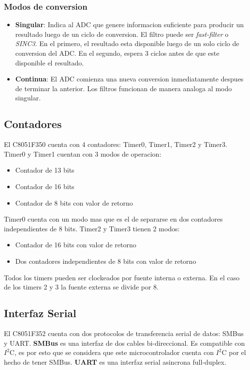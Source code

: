 \documentclass{article}
\theoremstyle{definition}
\theoremstyle{remark}
\begin{document}
\subsubsection{Modos de conversion}
\begin{itemize}
  \item \textbf{Singular}: Indica al ADC que genere informacion suficiente para producir un resultado luego de un ciclo de conversion. El filtro puede ser \emph{fast-filter} o \emph{SINC3}. En el primero, el resultado esta disponible luego de un solo ciclo de conversion del ADC. En el segundo, espera 3 ciclos antes de que este disponible el resultado.
  \item \textbf{Continua}: El ADC comienza una nueva conversion inmediatamente despues de terminar la anterior. Los filtros funcionan de manera analoga al modo singular.
\end{itemize}

\subsection{Contadores}\label{sec:contadores}
El C8051F350 cuenta con 4 contadores: Timer0, Timer1, Timer2 y Timer3. Timer0 y Timer1 cuentan con 3 modos de operacion:
\begin{itemize}
  \item Contador de 13 bits
  \item Contador de 16 bits
  \item Contador de 8 bits con valor de retorno
\end{itemize}
Timer0 cuenta con un modo mas que es el de separarse en dos contadores independientes de 8 bits.
Timer2 y Timer3 tienen 2 modos:
 \begin{itemize}
   \item Contador de 16 bits con valor de retorno
   \item Dos contadores independientes de 8 bits con valor de retorno
 \end{itemize}

Todos los timers pueden ser clockeados por fuente interna o externa. En el caso de los timers 2 y 3 la fuente externa se divide por 8.

\subsection{Interfaz Serial}\label{sec:serial}
El C8051F352 cuenta con dos protocolos de transferencia serial de datos: SMBus y UART. \textbf{SMBus} es una interfaz de dos cables bi-direccional. Es compatible con $I^{2}$C, es por esto que se considera que este microcontrolador cuenta con $I^{2}$C por el hecho de tener SMBus. \textbf{UART} es una interfaz serial asincrona full-duplex.
\end{document}
